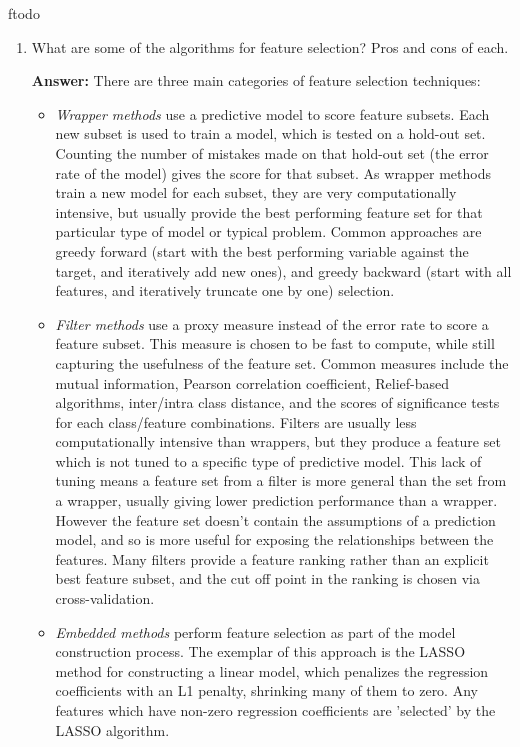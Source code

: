 ƒtodo\documentclass{article}
\newenvironment{QandA}{\begin{enumerate}[label=\arabic*.]}{\end{enumerate}}
\newenvironment{InnerQandA}{\begin{enumerate}[label=\roman*.]}{\end{enumerate}}
\newenvironment{answer}{\par\normalfont \textbf{Answer:}}{}
\begin{document}
\begin{QandA}
\begin{InnerQandA}
        \item What are some of the algorithms for feature selection? Pros and cons of each.
        \begin{answer}
            There are three main categories of feature selection techniques:
            \begin{itemize}
                \item \textit{Wrapper methods} use a predictive model to score feature subsets. Each new subset is used to train a model, which is tested on a hold-out set. Counting the number of mistakes made on that hold-out set (the error rate of the model) gives the score for that subset. As wrapper methods train a new model for each subset, they are very computationally intensive, but usually provide the best performing feature set for that particular type of model or typical problem. Common approaches are greedy forward (start with the best performing variable against the target, and iteratively add new ones), and greedy backward (start with all features, and iteratively truncate one by one) selection.
                \item \textit{Filter methods} use a proxy measure instead of the error rate to score a feature subset. This measure is chosen to be fast to compute, while still capturing the usefulness of the feature set. Common measures include the mutual information, Pearson correlation coefficient, Relief-based algorithms, inter/intra class distance, and the scores of significance tests for each class/feature combinations. Filters are usually less computationally intensive than wrappers, but they produce a feature set which is not tuned to a specific type of predictive model. This lack of tuning means a feature set from a filter is more general than the set from a wrapper, usually giving lower prediction performance than a wrapper. However the feature set doesn't contain the assumptions of a prediction model, and so is more useful for exposing the relationships between the features. Many filters provide a feature ranking rather than an explicit best feature subset, and the cut off point in the ranking is chosen via cross-validation. 
                \item \textit{Embedded methods} perform feature selection as part of the model construction process. The exemplar of this approach is the LASSO method for constructing a linear model, which penalizes the regression coefficients with an L1 penalty, shrinking many of them to zero. Any features which have non-zero regression coefficients are 'selected' by the LASSO algorithm.
            \end{itemize}


\end{answer}
\end{InnerQandA}
\end{QandA}
\end{document}

